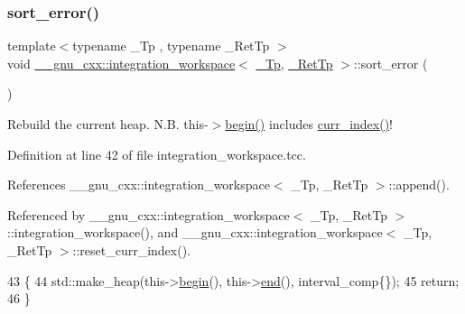 \subsubsection{\texorpdfstring{sort\+\_\+error()}{sort\_error()}}
{\footnotesize\ttfamily template$<$typename \+\_\+\+Tp , typename \+\_\+\+Ret\+Tp $>$ \\
void \hyperlink{class____gnu__cxx_1_1integration__workspace}{\+\_\+\+\_\+gnu\+\_\+cxx\+::integration\+\_\+workspace}$<$ \hyperlink{namespace____gnu__cxx_a3b19a9c800ca194374ef9172290f7d79}{\+\_\+\+Tp}, \hyperlink{namespace____gnu__cxx_a886e03ece3d53ff7fa6c098a40f93fa5}{\+\_\+\+Ret\+Tp} $>$\+::sort\+\_\+error (\begin{DoxyParamCaption}{ }\end{DoxyParamCaption})}

Rebuild the current heap. N.\+B. this-\/$>$\hyperlink{class____gnu__cxx_1_1integration__workspace_a9ecef94e75c1bc84e59300fe6504eed9}{begin()} includes \hyperlink{class____gnu__cxx_1_1integration__workspace_a51a384b1777615943add69f1895454f5}{curr\+\_\+index()}! 

Definition at line 42 of file integration\+\_\+workspace.\+tcc.



References \+\_\+\+\_\+gnu\+\_\+cxx\+::integration\+\_\+workspace$<$ \+\_\+\+Tp, \+\_\+\+Ret\+Tp $>$\+::append().



Referenced by \+\_\+\+\_\+gnu\+\_\+cxx\+::integration\+\_\+workspace$<$ \+\_\+\+Tp, \+\_\+\+Ret\+Tp $>$\+::integration\+\_\+workspace(), and \+\_\+\+\_\+gnu\+\_\+cxx\+::integration\+\_\+workspace$<$ \+\_\+\+Tp, \+\_\+\+Ret\+Tp $>$\+::reset\+\_\+curr\+\_\+index().


\begin{DoxyCode}
43     \{
44       std::make\_heap(this->\hyperlink{class____gnu__cxx_1_1integration__workspace_a9ecef94e75c1bc84e59300fe6504eed9}{begin}(), this->\hyperlink{class____gnu__cxx_1_1integration__workspace_a0494e3b36de996e0a85552aaaac11c03}{end}(), interval\_comp\{\});
45       \textcolor{keywordflow}{return};
46     \}
\end{DoxyCode}
\mbox{\label{class____gnu__cxx_1_1integration__workspace_ab230bc53a2b794e466516b690f8bf90b}} 
